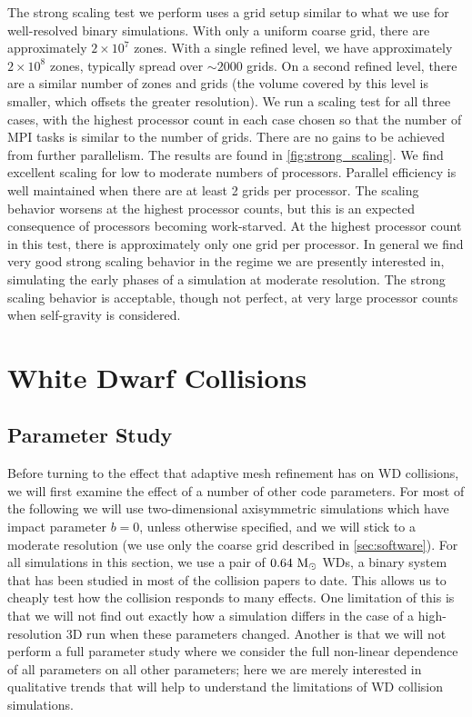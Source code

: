 \documentclass[12pt]{article}
\begin{document}
The strong scaling test we perform uses a grid setup similar to what we 
use for well-resolved binary simulations. With only a uniform coarse grid, 
there are approximately $2 \times 10^7$ zones. With a single refined level, 
we have approximately $2 \times 10^8$ zones, typically spread over $\sim 2000$ grids.
On a second refined level, there are a similar number of zones and grids 
(the volume covered by this level is smaller, which offsets the greater resolution).
We run a scaling test for all three cases, with the 
highest processor count in each case chosen so that the number of 
MPI tasks is similar to the number of grids. There are no gains 
to be achieved from further parallelism. The results are found in 
\autoref{fig:strong_scaling}. We find excellent scaling for low to moderate numbers 
of processors. Parallel efficiency is well maintained when there are 
at least 2 grids per processor. The 
scaling behavior worsens at the highest processor counts, but this is 
an expected consequence of processors becoming work-starved. At the highest 
processor count in this test, there is approximately only one grid per processor. In general 
we find very good strong scaling behavior in the regime we are presently 
interested in, simulating the early phases of a simulation at moderate 
resolution. The strong scaling behavior is acceptable, though not perfect, 
at very large processor counts when self-gravity is considered.



\clearpage
\section{White Dwarf Collisions}
\label{sec:collisions}

\subsection{Parameter Study}
\label{sec:collision_parameters}

Before turning to the effect that adaptive mesh refinement has on WD collisions,
we will first examine the effect of a number of other code parameters. For most
of the following we will use two-dimensional axisymmetric simulations which have
impact parameter $b = 0$, unless otherwise specified, and we will stick to a
moderate resolution (we use only the coarse grid described in \autoref{sec:software}).
For all simulations in this section, we use a pair of $0.64\ \msolar$ WDs, a binary
system that has been studied in most of the collision papers to date. This allows
us to cheaply test how the collision responds to many effects. One limitation of
this is that we will not find out exactly how a simulation differs in the case of a
high-resolution 3D run when these parameters changed. Another is that we will not
perform a full parameter study where we consider the full non-linear dependence of
all parameters on all other parameters; here we are merely interested in qualitative
trends that will help to understand the limitations of WD collision simulations.
\end{document}
